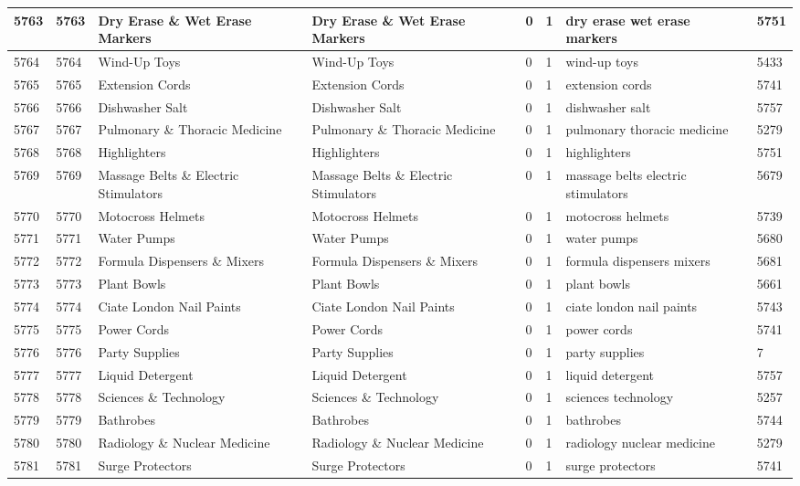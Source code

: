 \begin{longtable}{|l|l|l|l|l|l|l|l|}
5763 & 5763 & Dry Erase \& Wet Erase Markers & Dry Erase \& Wet Erase Markers & 0 & 1 & dry erase wet erase markers & 5751 \\ \hline 
5764 & 5764 & Wind-Up Toys & Wind-Up Toys & 0 & 1 & wind-up toys & 5433 \\ \hline 
5765 & 5765 & Extension Cords & Extension Cords & 0 & 1 & extension cords & 5741 \\ \hline 
5766 & 5766 & Dishwasher Salt & Dishwasher Salt & 0 & 1 & dishwasher salt & 5757 \\ \hline 
5767 & 5767 & Pulmonary \& Thoracic Medicine & Pulmonary \& Thoracic Medicine & 0 & 1 & pulmonary thoracic medicine & 5279 \\ \hline 
5768 & 5768 & Highlighters & Highlighters & 0 & 1 & highlighters & 5751 \\ \hline 
5769 & 5769 & Massage Belts \& Electric Stimulators & Massage Belts \& Electric Stimulators & 0 & 1 & massage belts electric stimulators & 5679 \\ \hline 
5770 & 5770 & Motocross Helmets & Motocross Helmets & 0 & 1 & motocross helmets & 5739 \\ \hline 
5771 & 5771 & Water Pumps & Water Pumps & 0 & 1 & water pumps & 5680 \\ \hline 
5772 & 5772 & Formula Dispensers \& Mixers & Formula Dispensers \& Mixers & 0 & 1 & formula dispensers mixers & 5681 \\ \hline 
5773 & 5773 & Plant Bowls & Plant Bowls & 0 & 1 & plant bowls & 5661 \\ \hline 
5774 & 5774 & Ciate London Nail Paints & Ciate London Nail Paints & 0 & 1 & ciate london nail paints & 5743 \\ \hline 
5775 & 5775 & Power Cords & Power Cords & 0 & 1 & power cords & 5741 \\ \hline 
5776 & 5776 & Party Supplies & Party Supplies & 0 & 1 & party supplies & 7 \\ \hline 
5777 & 5777 & Liquid Detergent & Liquid Detergent & 0 & 1 & liquid detergent & 5757 \\ \hline 
5778 & 5778 & Sciences \& Technology & Sciences \& Technology & 0 & 1 & sciences technology & 5257 \\ \hline 
5779 & 5779 & Bathrobes & Bathrobes & 0 & 1 & bathrobes & 5744 \\ \hline 
5780 & 5780 & Radiology \& Nuclear Medicine & Radiology \& Nuclear Medicine & 0 & 1 & radiology nuclear medicine & 5279 \\ \hline 
5781 & 5781 & Surge Protectors & Surge Protectors & 0 & 1 & surge protectors & 5741 \\ \hline 

\end{longtable}
